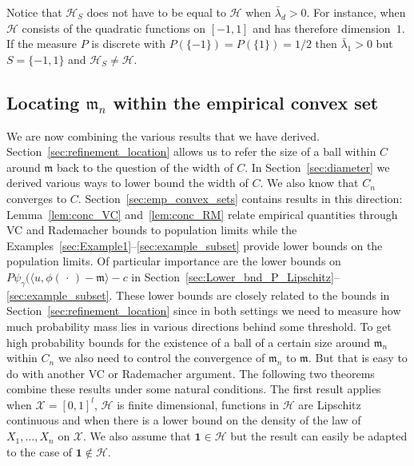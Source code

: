 \documentclass[10pt]{amsart}
\theoremstyle{definition}\newtheorem{defi}[theo]{Definition}\newtheorem{rema}[theo]{Remark}\newtheorem{exam}[theo]{Example}\newtheorem{exem}[theo]{Example}\newtheorem{nota}[theo]{Notation}
\theoremstyle{remark}
\newcommand{\X}{\mathcal{X}}
\newcommand{\cH}{\mathcal{H}}
\newcommand{\mean}{\mathfrak{m}}
\begin{document}
Notice that $\cH_S$ does not have to be equal to $\cH$ when $\bar \lambda_d > 0$. For instance, when $\cH$ consists of the quadratic functions on $[-1,1]$ and has therefore dimension~$1$. If the measure $P$ is discrete with $P(\{-1\}) = P(\{1\}) = 1/2$ then $\bar \lambda_1 > 0$ but $S = \{ -1,1\}$ and $\cH_S \not = \cH$.

\subsection{Locating \texorpdfstring{$\mean_n$}{mean\_n} within the empirical convex set} \label{sec:bringing_it_together}

We are now combining the various results that we have derived. Section~\ref{sec:refinement_location} allows us to refer the size of a ball within $C$ around $\mean$ back to the question of the width of $C$. In Section~\ref{sec:diameter} we derived various ways to lower bound the width of $C$. We also know that $C_n$ converges to $C$. Section~\ref{sec:emp_convex_sets} contains results in this direction: Lemma~\ref{lem:conc_VC} and~\ref{lem:conc_RM} relate empirical quantities through VC and Rademacher bounds to population limits while the Examples~\ref{sec:Example1}--\ref{sec:example_subset} provide lower bounds on the population limits. Of particular importance are the lower bounds on $P \psi_\gamma(\langle u,\phi(\,\cdot\,) - \mean \rangle -c$ in Section~\ref{sec:Lower_bnd_P_Lipschitz}--\ref{sec:example_subset}. These lower bounds are closely related to the bounds in Section~\ref{sec:refinement_location} since in both settings we need to measure how much probability mass lies in various directions behind some threshold. To get high probability bounds for the existence of a ball of a certain size around $\mean_n$ within $C_n$ we also need to control the convergence of $\mean_n$ to $\mean$. But that is easy to do with another VC or Rademacher argument. The following two theorems combine these results under some natural conditions. The first result applies when $\X =[0,1]^l$, $\cH$ is finite dimensional, functions in $\cH$ are Lipschitz continuous and when there is a lower bound on the density of the law of $X_1,\dots,X_n$ on $\X$. We also assume that $\bm 1 \in \cH$ but the result can easily be adapted to the case of $\bm 1 \not \in \cH$.
\end{document}
